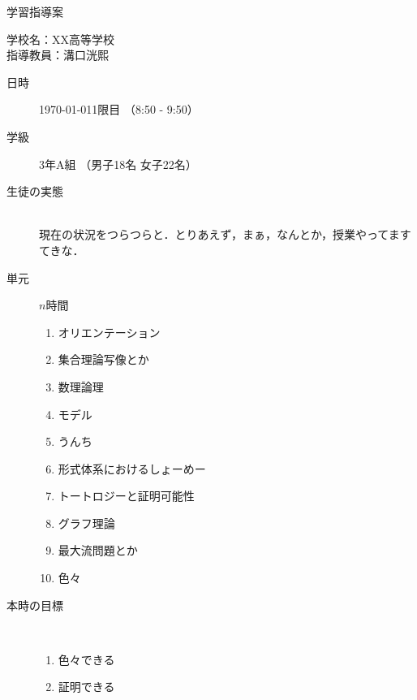 \documentclass[paper=a4,fontsize=10.5pt]{jlreq}
\begin{document}
\begin{center}
    {\LARGE 学習指導案}
\end{center}
\begin{flushright}
    学校名：XX高等学校\\
    指導教員：溝口洸熙
\end{flushright}
\begin{description}
    \item[日時] \today 1限目 （8:50 - 9:50）
    \item[学級] 3年A組 （男子18名 女子22名）
    \item[生徒の実態] \ \\
        現在の状況をつらつらと．とりあえず，まぁ，なんとか，授業やってますてきな．
    \item[単元] \(n\)時間\\
        \begin{minipage}[t]{0.45\linewidth}
            \centering
            \begin{enumerate}
                \item オリエンテーション
                \item 集合理論写像とか
                \item 数理論理
                \item モデル
                \item うんち
            \end{enumerate}
        \end{minipage}
        \begin{minipage}[t]{0.45\linewidth}
            \centering
            \begin{enumerate}
                \setcounter{enumi}{5}
                \item 形式体系におけるしょーめー
                \item トートロジーと証明可能性
                \item グラフ理論
                \item 最大流問題とか
                \item 色々
            \end{enumerate}
        \end{minipage}
        \vspace{1em}
        \item[本時の目標]\
        \begin{enumerate}
            \item 色々できる
            \item 証明できる

\end{enumerate}
\end{description}
\end{document}

